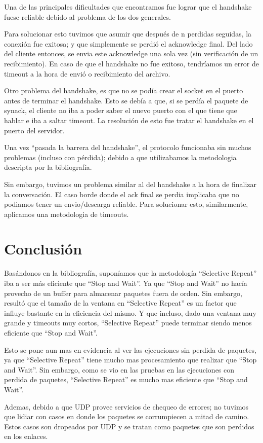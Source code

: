 \documentclass{article}
\begin{document}
Una de las principales dificultades que encontramos fue lograr que el handshake fuese reliable debido al problema de los dos generales.

Para solucionar esto tuvimos que asumir que después de n perdidas seguidas, la conexión fue exitosa; y que simplemente se perdió el acknowledge final. Del lado del cliente entonces, se envia este acknowledge una sola vez (sin verificación de un recibimiento). 
En caso de que el handshake no fue exitoso, tendríamos un error de timeout a la hora de envió o recibimiento del archivo.

Otro problema del handshake, es que no se podía crear el socket en el puerto antes de terminar el handshake. Esto se debía a que, si se perdía el paquete de synack, el cliente no iba a poder saber el nuevo puerto con el que tiene que hablar e iba a saltar timeout. La resolución de esto fue tratar el handshake en el puerto del servidor.

Una vez ``pasada la barrera del handshake'', el protocolo funcionaba sin muchos problemas (incluso con pérdida); debido a que utilizabamos la metodologia descripta por la bibliografía.

Sin embargo, tuvimos un problema similar al del handshake a la hora de finalizar la conversación. El caso borde donde el ack final se perdia implicaba que no podiamos tener un envio/descarga reliable. Para solucionar esto, similarmente, aplicamos una metodologia de timeouts. 

\section{\texorpdfstring{\textbf{Conclusión}}{Conclusión}}\label{conclusiuxf3n-wip}
Basándonos en la bibliografía, suponíamos que la metodología ``Selective Repeat'' iba a ser más eficiente que ``Stop and Wait''. Ya que ``Stop and Wait'' no hacía provecho de un buffer para almacenar paquetes fuera de orden.
Sin embargo, resultó que el tamaño de la ventana en ``Selective Repeat'' es un factor que influye bastante en la eficiencia del mismo. Y que incluso, dado una ventana muy grande y timeouts muy cortos, ``Selective Repeat'' puede terminar siendo menos eficiente que ``Stop and Wait''.

Esto se pone aun mas en evidencia al ver las ejecuciones sin perdida de paquetes, ya que ``Selective Repeat'' tiene mucho mas procesamiento que realizar que ``Stop and Wait''. Sin embargo, como se vio en las pruebas en las ejecuciones con perdida de paquetes, ``Selective Repeat'' es mucho mas eficiente que ``Stop and Wait''.


Ademas, debido a que UDP provee servicios de chequeo de errores; no tuvimos que lidiar con casos en donde los paquetes se corrumpiecen a mitad de camino. Estos casos son dropeados por UDP y se tratan como paquetes que son perdidos en los enlaces.
\end{document}
